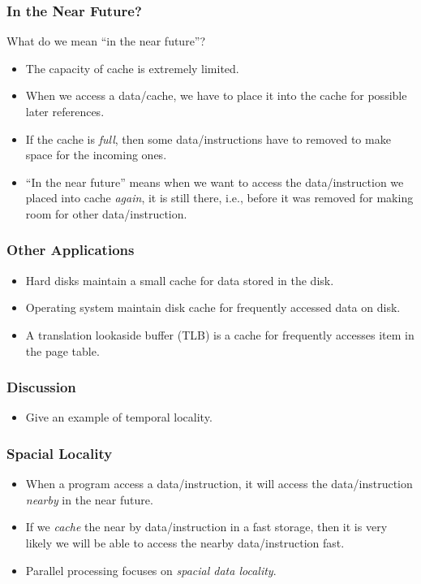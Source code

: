 \documentclass{beamer}
\begin{document}
\begin{CJK}{UTF8}{bsmi}
\begin{frame}
\frametitle{In the Near Future?}  What do we mean ``in the near
future''?
\begin{itemize}
\item The capacity of cache is extremely limited.
\item When we access a data/cache, we have to place it into the cache
  for possible later references.
\item If the cache is {\em full}, then some data/instructions have to
  removed to make space for the incoming ones.
\item ``In the near future'' means when we want to access the
  data/instruction we placed into cache {\em again}, it is still
  there, i.e., before it was removed for making room for other
  data/instruction.
\end{itemize}
\end{frame}

\begin{frame}
\frametitle{Other Applications}
\begin{itemize}
\item Hard disks maintain a small cache for data stored in the disk.
\item Operating system maintain disk cache for frequently accessed
  data on disk.
\item A translation lookaside buffer (TLB) is a cache for frequently
  accesses item in the page table.
\end{itemize}
\end{frame}

\begin{frame}
\frametitle{Discussion}
\begin{itemize}
\item Give an example of temporal locality.
\end{itemize}
\end{frame}

\begin{frame}
\frametitle{Spacial Locality}
\begin{itemize}
\item When a program access a data/instruction, it will access the
  data/instruction {\em nearby} in the near future.
\item If we {\em cache} the near by data/instruction in a fast
  storage, then it is very likely we will be able to access the nearby
  data/instruction fast.
\item Parallel processing focuses on {\em spacial data locality}.
\end{itemize}
\end{frame}


\end{CJK}
\end{document}
